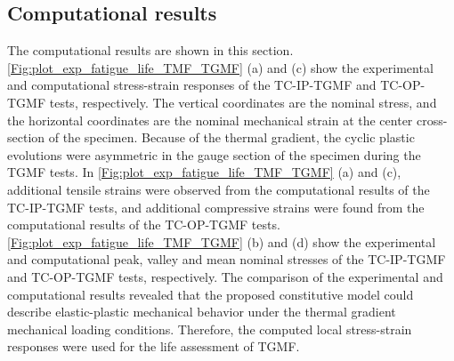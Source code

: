 \renewcommand\arraystretch{1}

\subsection{Computational results}
\noindent
The computational results are shown in this section. \ref{Fig:plot_exp_fatigue_life_TMF_TGMF} (a) and (c) show the experimental and computational stress-strain responses of the TC-IP-TGMF and TC-OP-TGMF tests, respectively. The vertical coordinates are the nominal stress, and the horizontal coordinates are the nominal mechanical strain at the center cross-section of the specimen. Because of the thermal gradient, the cyclic plastic evolutions were asymmetric in the gauge section of the specimen during the TGMF tests. In \ref{Fig:plot_exp_fatigue_life_TMF_TGMF} (a) and (c), additional tensile strains were observed from the computational results of the TC-IP-TGMF tests, and additional compressive strains were found from the computational results of the TC-OP-TGMF tests. \ref{Fig:plot_exp_fatigue_life_TMF_TGMF} (b) and (d) show the experimental and computational peak, valley and mean nominal stresses of the TC-IP-TGMF and TC-OP-TGMF tests, respectively. The comparison of the experimental and computational results revealed that the proposed constitutive model could describe elastic-plastic mechanical behavior under the thermal gradient mechanical loading conditions. Therefore, the computed local stress-strain responses were used for the life assessment of TGMF.

